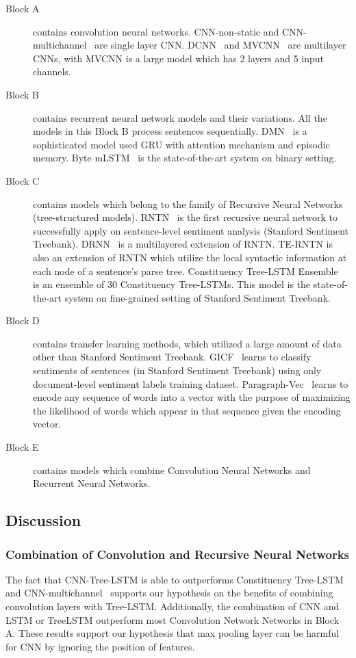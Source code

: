 \begin{description}
	\item[Block A] contains convolution neural networks.
	CNN-non-static and CNN-multichannel~\cite{KimCNN} are single layer CNN.
	DCNN~\cite{DCNN} and MVCNN~\cite{2-layer-cnn} are multilayer CNNs, with MVCNN is a large model  which has 2 layers and 5 input channels.
	\item[Block B] contains recurrent neural network models and their variations.
	All the models in this Block B process sentences sequentially.
	DMN~\cite{attention-gru} is a sophisticated model used GRU with attention mechanism and episodic memory.
	Byte mLSTM~\cite{mlstm} is the state-of-the-art system on binary setting.
	\item[Block C] contains models which belong to the family of Recursive Neural Networks (tree-structured models).
	RNTN~\cite{socher2013recursive} is the first recursive neural network to successfully apply on sentence-level sentiment analysis (Stanford Sentiment Treebank).
	DRNN~\cite{IrsoyDRNN} is a multilayered extension of RNTN.
	TE-RNTN is also an extension of RNTN which utilize the local syntactic information at each node of a sentence's parse tree.
	Constituency Tree-LSTM Ensemble~\cite{LooksHHN17} is an ensemble of 30 Constituency Tree-LSTMs.
	This model is the state-of-the-art system on fine-grained setting of Stanford Sentiment Treebank.
	\item[Block D] contains transfer learning methods, which utilized a large amount of data other than Stanford Sentiment Treebank.
	GICF~\cite{group-instance} learns to classify sentiments of sentences (in Stanford Sentiment Treebank) using only document-level sentiment labels training dataset.
	Paragraph-Vec~\cite{ParagraphVec} learns to encode any sequence of words into a vector with the purpose of maximizing the likelihood of words which appear in that sequence given the encoding vector.
	\item[Block E] contains models which combine Convolution Neural Networks and Recurrent Neural Networks.
\end{description}
\subsection{Discussion}
\subsubsection{Combination of Convolution and Recursive Neural Networks}
The fact that CNN-Tree-LSTM is able to outperforms Constituency Tree-LSTM~\cite{treeLSTM} and CNN-multichannel~\cite{KimCNN} supports our hypothesis on the benefits of combining convolution layers with Tree-LSTM.
Additionally, the combination of CNN and LSTM or TreeLSTM outperform most Convolution Network Networks in Block A.
These results support our hypothesis that max pooling layer can be harmful for CNN by ignoring the position of features.
